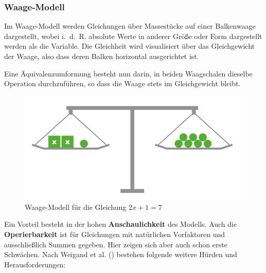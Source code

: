 \documentclass[
]{scrbook}
\theoremstyle{definition}
\theoremstyle{definition}
\theoremstyle{definition}
\theoremstyle{definition}
\theoremstyle{remark}
\begin{document}
\subsubsection{Waage-Modell}\label{waage-modell}

Im Waage-Modell werden Gleichungen über Massestücke auf einer Balkenwaage dargestellt, wobei i.~d.~R. absolute Werte in anderer Größe oder Form dargestellt werden als die Variable. Die Gleichheit wird visualisiert über das Gleichgewicht der Waage, also dass deren Balken horizontal ausgerichtet ist.

Eine Äquivalenzumformung besteht nun darin, in beiden Waagschalen dieselbe Operation durchzuführen, so dass die Waage stets im Gleichgewicht bleibt.

\begin{figure}

{\centering \includegraphics[width=0.75\linewidth]{pictures/8-Waage} 

}

\caption{Waage-Modell für die Gleichung $2x+1 = 7$}\label{fig:Waage}
\end{figure}

Ein Vorteil besteht in der hohen \textbf{Anschaulichkeit} des Modells. Auch die \textbf{Operierbarkeit} ist für Gleichungen mit natürlichen Vorfaktoren und ausschließlich Summen gegeben. Hier zeigen sich aber auch schon erste Schwächen. Nach Weigand et al. () bestehen folgende weitere Hürden und Herausforderungen:
\end{document}
